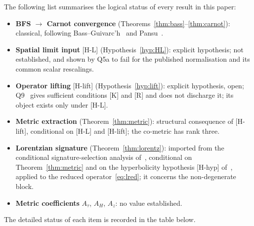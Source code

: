 \documentclass[11pt,a4paper]{article}
\theoremstyle{definition}
\theoremstyle{remark}
\begin{document}
    The following list summarises the logical status of every result in this paper:
    \begin{itemize}
      \item \textbf{BFS $\to$ Carnot convergence} (Theorems~\ref{thm:bass}--\ref{thm:carnot}):
      classical, following Bass--Guivarc'h~\cite{Bass1972,Guivarch1973} and
      Pansu~\cite{Pansu1983}.
      \item \textbf{Spatial limit input} [H-L] (Hypothesis~\ref{hyp:HL}): explicit
      hypothesis; not established, and shown by Q5a to fail for the published
      normalisation and its common scalar rescalings.
      \item \textbf{Operator lifting} [H-lift] (Hypothesis~\ref{hyp:lift}): explicit hypothesis, open;
      Q9~\cite{Beau2026q9} gives sufficient conditions [K] and [R] and does not discharge it; its object exists only
      under [H-L].
      \item \textbf{Metric extraction} (Theorem~\ref{thm:metric}): structural consequence
      of [H-lift], conditional on [H-L] and [H-lift]; the co-metric has rank three.
      \item \textbf{Lorentzian signature} (Theorem~\ref{thm:lorentz}): imported from the
      conditional signature-selection analysis of~\cite{Beau2026c}, conditional on
      Theorem~\ref{thm:metric} and on the hyperbolicity hypothesis [H-hyp]
      of~\cite{Beau2026c}, applied to the reduced operator~\eqref{eq:lred}; it concerns the non-degenerate block.
      \item \textbf{Metric coefficients} $A_\tau$, $A_H$, $A_z$: no value established.
    \end{itemize}

    \medskip
    The detailed status of each item is recorded in the table below.
\end{document}
